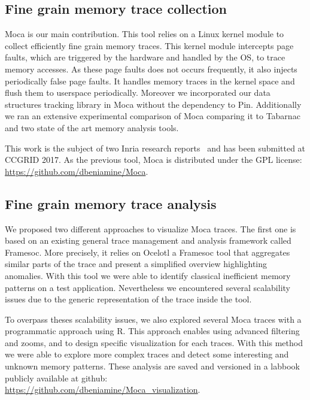 \subsection{Fine grain memory trace collection}

\gls{Moca} is our main contribution.
This tool relies on a \gls{Linux} kernel module to collect efficiently fine grain memory traces.
This kernel module intercepts page faults, which are triggered by the hardware and handled by the \gls{OS}, to trace memory accesses.
As these page faults does not occurs frequently, it also injects periodically false page faults.
It handles memory traces in the kernel space and flush them to userspace periodically.
Moreover we incorporated our data structures tracking library in \gls{Moca} without the dependency to \gls{Pin}.
Additionally we ran an extensive experimental comparison of \gls{Moca} comparing it to \gls{Tabarnac} and two state of the art memory analysis tools.

This work is the subject of two Inria research reports~\cite{Beniamine15Memory,Beniamine16Moca} and has been submitted at \gls{CCGRID} 2017.
As the previous tool, \gls{Moca} is distributed under the \gls{GPL} license:\\
\url{https://github.com/dbeniamine/Moca}.

\subsection{Fine grain memory trace analysis}

We proposed two different approaches to visualize \gls{Moca} traces.
The first one is based on an existing general trace management and analysis framework called \gls{Framesoc}.
More precisely, it relies on \gls{Ocelotl} a \gls{Framesoc} tool that aggregates similar parts of the trace and present a simplified overview highlighting anomalies.
With this tool we were able to identify classical inefficient memory patterns on a test application.
Nevertheless we encountered several scalability issues due to the generic representation of the trace inside the tool.

To overpass theses scalability issues, we also explored several \gls{Moca} traces with a programmatic approach using \gls{R}.
This approach enables using advanced filtering and zooms, and to design specific visualization for each traces.
With this method we were able to explore more complex traces and detect some interesting and unknown memory patterns.
These analysis are saved and versioned in a labbook publicly available at github:\\
\url{https://github.com/dbeniamine/Moca_visualization}.

